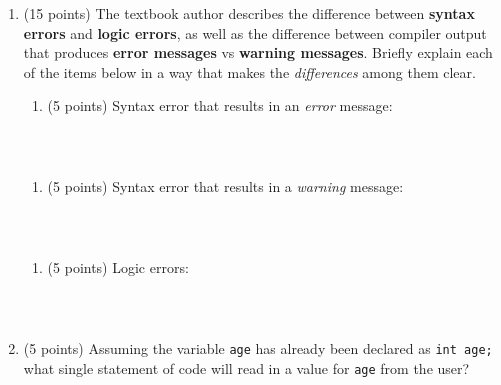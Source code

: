 \begin{enumerate}
\def\labelenumi{\arabic{enumi}.}
\setcounter{enumi}{2}
\item
  (15 points) The textbook author describes the difference between
  \textbf{syntax errors} and \textbf{logic errors}, as well as the
  difference between compiler output that produces \textbf{error
  messages} vs \textbf{warning messages}. Briefly explain each of the
  items below in a way that makes the \emph{differences} among them
  clear.

  \begin{enumerate}
  \def\labelenumii{\alph{enumii}.}
  \tightlist
  \item
    (5 points) Syntax error that results in an \emph{error} message:
  \end{enumerate}

\begin{verbatim}



\end{verbatim}

  \begin{enumerate}
  \def\labelenumii{\alph{enumii}.}
  \setcounter{enumii}{1}
  \tightlist
  \item
    (5 points) Syntax error that results in a \emph{warning} message:
  \end{enumerate}

\begin{verbatim}



\end{verbatim}

  \begin{enumerate}
  \def\labelenumii{\alph{enumii}.}
  \setcounter{enumii}{2}
  \tightlist
  \item
    (5 points) Logic errors:
  \end{enumerate}

\begin{verbatim}



\end{verbatim}
\item
  (5 points) Assuming the variable \texttt{age} has already been
  declared as \texttt{int\ age;} what single statement of code will read
  in a value for \texttt{age} from the user?
\end{enumerate}

\begin{verbatim}

\end{verbatim}

